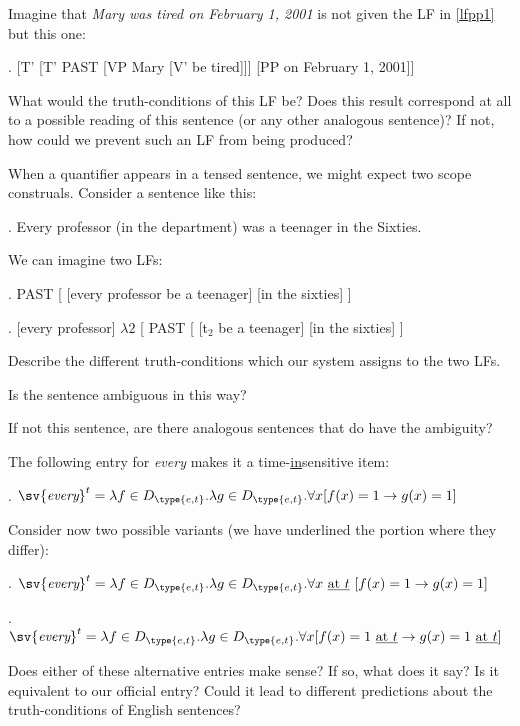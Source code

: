 \begin{exercise}

Imagine that \emph{Mary was tired on February 1, 2001} is not given the LF in \ref{lfpp1} but this one:

\exi. [T' [T' PAST [VP Mary [V' be tired]]] [PP on February 1, 2001]]

What would the truth-conditions of this LF be? Does this result correspond at all to a possible reading of this sentence (or any other analogous sentence)? If not, how could we prevent such an LF from being produced?\eex
\end{exercise}

\begin{exercise}

When a quantifier appears in a tensed sentence, we might expect 
two scope construals. Consider a sentence like this:

\ex. Every professor (in the department) was a teenager in the Sixties.

We can imagine two LFs:

\ex.  PAST [ [every professor be a teenager] [in the sixties] ]

\ex.  [every professor] $\lambda 2$ [ PAST [ [t$_2$ be a teenager] [in the sixties] ]

Describe the different truth-conditions which our system assigns to the two LFs.

Is the sentence ambiguous in this way?

If not this sentence, are there analogous sentences that do have the ambiguity?\eex
\end{exercise}

\begin{exercise}

The following entry for \emph{every} makes it a time-\underline{in}sensitive item:

\ex. $\sv{\emph{every}}^{t} = \ensuremath{\lambda}f\ensuremath{\in}D_{\type{e,t}}. \ensuremath{\lambda}g\ensuremath{\in}D_{\type{e,t}}.\ensuremath{\forall}x 
[ f(x) = 1 \ensuremath{\rightarrow} g(x) = 1 ]$

Consider now two possible variants (we have underlined the portion where they differ):

\ex. $\sv{\emph{every}}^{t} = \ensuremath{\lambda}f\ensuremath{\in}D_{\type{e,t}}. \ensuremath{\lambda}g\ensuremath{\in}D_{\type{e,t}}.\ensuremath{\forall}x\ \underline{\mbox{at }t}\ [ f(x) = 1 \ensuremath{\rightarrow} g(x) = 1 ]$

\ex. $\sv{\emph{every}}^{t} = \ensuremath{\lambda}f\ensuremath{\in}D_{\type{e,t}}. \ensuremath{\lambda}g\ensuremath{\in}D_{\type{e,t}}.\ensuremath{\forall}x 
[ f(x) = 1\ \underline{\mbox{at }t} \ensuremath{\rightarrow} g(x) = 1\ \underline{\mbox{at }t} ]$

Does either of these alternative entries make sense? If so, what does it say? Is it equivalent to our official entry? Could it lead to different predictions about the truth-conditions of English sentences?\eex
\end{exercise}


